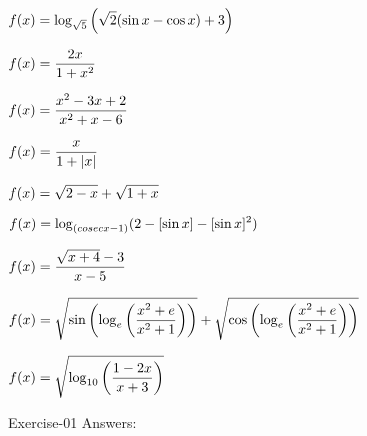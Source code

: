\documentclass[addpoints]{exam}
\begin{document}
\begin{questions}
\question $\mathlarger{f(x)= \log_{\sqrt{5}} \Big(\sqrt{2}(\sin x -\cos x) +3 \Big ) }$

\question $\mathlarger{f(x)= \dfrac{2x}{1+x^{2}}}$

\question $\mathlarger{f(x)= \dfrac{x^2 -3x +2}{x^2 +x -6}}$

\question $\mathlarger{f(x)= \dfrac{x}{1+|x|}}$

\question $\mathlarger{f(x)= \sqrt{2-x} +\sqrt{1+x}}$

\question $\mathlarger{f(x)= \log_{(cosec x -1)} (2-[\sin x]  -[\sin x]^{2})}$

\question $\mathlarger{f(x)= \dfrac{\sqrt{x+4} -3}{x-5}}$

\question $\mathlarger{ f(x)=\sqrt{\sin\left(\log_{e}\left(\dfrac{x^2+e}{x^2+1}\right)\right)}+\sqrt{\cos\left(\log_{e}\left(\dfrac{x^2+e}{x^2+1}\right)\right)}}$

			\question $f(x)=\mathlarger{\sqrt{\log_{10}\left(\dfrac{1-2x}{x+3}\right)} }$
\end{questions}
\begin{center}
\begin{LARGE}
Exercise-01
Answers:
\end{LARGE}
\end{center}
\end{document}
